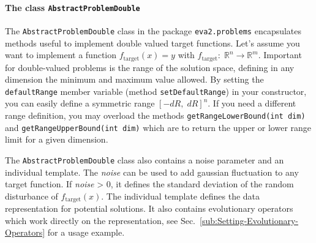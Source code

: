 \paragraph*{The class \texttt{AbstractProblemDouble}}

The \texttt{AbstractProblemDouble} class in the package \texttt{eva2.prob\-lems}
encapsulates methods useful to implement double valued target functions.
Let's assume you want to implement a function $f_{\mathrm{target}}(x)=y$
with $f_{\mathrm{target}}:\;\mathbb{R}^{n}\rightarrow\mathbb{R}^{m}$.
Important for double-valued problems is the range of the solution
space, defining in any dimension the minimum and maximum value allowed.
By setting the \texttt{default\-Range} member variable (method \texttt{set\-Default\-Range})
in your constructor, you can easily define a symmetric range $[-dR,\; dR]^{n}$.
If you need a different range definition, you may overload the methods
\texttt{getRangeLowerBound(int dim)} and \texttt{getRangeUpperBound(int
dim)} which are to return the upper or lower range limit for a given
dimension.%

{} 

The \texttt{AbstractProblemDouble} class also contains a noise parameter
and an individual template. The \emph{noise} can be used to add gaussian
fluctuation to any target function. If \emph{noise} > 0, it defines
the standard deviation of the random disturbance of $f_{\mathrm{target}}(x)$.
The individual template defines the data representation for potential
solutions. It also contains evolutionary operators which work directly
on the representation, see Sec.~\ref{sub:Setting-Evolutionary-Operators}
for a usage example.


